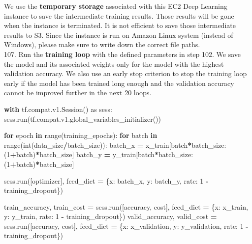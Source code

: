 \documentclass[]{book}
\newenvironment{Shaded}{\begin{snugshade}}{\end{snugshade}}
\newcommand{\KeywordTok}[1]{\textcolor[rgb]{0.13,0.29,0.53}{\textbf{#1}}}
\newcommand{\DecValTok}[1]{\textcolor[rgb]{0.00,0.00,0.81}{#1}}
\newcommand{\ImportTok}[1]{#1}
\newcommand{\ControlFlowTok}[1]{\textcolor[rgb]{0.13,0.29,0.53}{\textbf{#1}}}
\newcommand{\OperatorTok}[1]{\textcolor[rgb]{0.81,0.36,0.00}{\textbf{#1}}}
\newcommand{\BuiltInTok}[1]{#1}
\newcommand{\NormalTok}[1]{#1}
\begin{document}
We use the \textbf{temporary storage} associated with this EC2 Deep Learning instance to save the intermediate training results. Those results will be gone when the instance is terminated. It is not efficient to save those intermediate results to S3. Since the instance is run on Amazon Linux system (instead of Windows), please make sure to write down the correct file paths.\\
107. Run the \textbf{training loop} with the defined parameters in step 102. We save the model and its associated weights only for the model with the highest validation accuracy. We also use an early stop criterion to stop the training loop early if the model has been trained long enough and the validation accuracy cannot be improved further in the next 20 loops.

\begin{Shaded}
\begin{Highlighting}[]
\ControlFlowTok{with}\NormalTok{ tf.compat.v1.Session() }\ImportTok{as}\NormalTok{ sess:}
\NormalTok{    sess.run(tf.compat.v1.global_variables_initializer())}

    \ControlFlowTok{for}\NormalTok{ epoch }\KeywordTok{in} \BuiltInTok{range}\NormalTok{(training_epochs):}
        \ControlFlowTok{for}\NormalTok{ batch }\KeywordTok{in} \BuiltInTok{range}\NormalTok{(}\BuiltInTok{int}\NormalTok{(data_size}\OperatorTok{/}\NormalTok{batch_size)):}
\NormalTok{            batch_x }\OperatorTok{=}\NormalTok{ x_train[batch}\OperatorTok{*}\NormalTok{batch_size: (}\DecValTok{1}\OperatorTok{+}\NormalTok{batch)}\OperatorTok{*}\NormalTok{batch_size]}
\NormalTok{            batch_y }\OperatorTok{=}\NormalTok{ y_train[batch}\OperatorTok{*}\NormalTok{batch_size: (}\DecValTok{1}\OperatorTok{+}\NormalTok{batch)}\OperatorTok{*}\NormalTok{batch_size]}

\NormalTok{            sess.run([optimizer], feed_dict }\OperatorTok{=}\NormalTok{ \{x: batch_x, y: batch_y, rate: }\DecValTok{1} \OperatorTok{-}\NormalTok{ training_dropout\})}

\NormalTok{        train_accuracy, train_cost }\OperatorTok{=}\NormalTok{ sess.run([accuracy, cost], feed_dict }\OperatorTok{=}\NormalTok{ \{x: x_train, y: y_train, rate: }\DecValTok{1} \OperatorTok{-}\NormalTok{ training_dropout\})}
\NormalTok{        valid_accuracy, valid_cost }\OperatorTok{=}\NormalTok{ sess.run([accuracy, cost], feed_dict }\OperatorTok{=}\NormalTok{ \{x: x_validation, y: y_validation, rate: }\DecValTok{1} \OperatorTok{-}\NormalTok{ training_dropout\})}


\end{Highlighting}
\end{Shaded}
\end{document}
